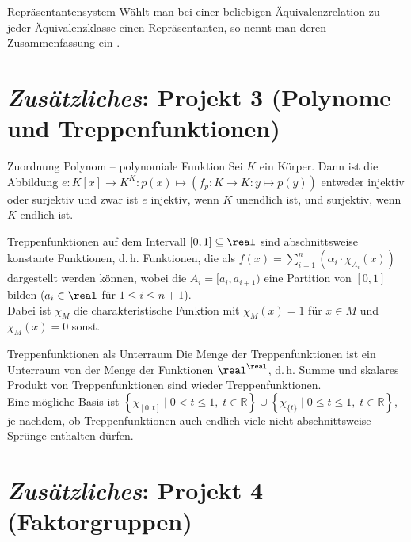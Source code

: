 \begin{Def}{Repräsentantensystem}
    Wählt man bei einer beliebigen Äquivalenzrelation zu jeder
    Äquivalenzklasse einen Repräsentanten, so nennt man deren
    Zusammenfassung ein .
\end{Def}

\section{%
    \emph{Zusätzliches}: Projekt 3 (Polynome und Treppenfunktionen)%
}

\begin{Satz}{Zuordnung Polynom -- polynomiale Funktion}
    Sei $K$ ein Körper.
    Dann ist die Abbildung
    $e: K[x] \rightarrow K^K: p(x) \mapsto
    (f_p: K \rightarrow K: y \mapsto p(y))$
    entweder injektiv oder surjektiv und zwar ist
    $e$ injektiv, wenn $K$ unendlich ist, und surjektiv, wenn $K$ endlich ist.
\end{Satz}

\begin{Def}{Treppenfunktionen}
     auf dem Intervall $[0, 1] \subseteq \real$
    sind abschnittsweise konstante Funktionen, d.\,h. Funktionen, die als
    $f(x) = \sum_{i=1}^n \left(\alpha_i \cdot \chi_{A_i}(x)\right)$ dargestellt
    werden können, wobei die $A_i = [a_i, a_{i+1})$ eine Partition von
    $[0, 1]$ bilden ($a_i \in \real$ für $1 \le i \le n + 1$). \\
    Dabei ist $\chi_M$ die charakteristische Funktion mit $\chi_M(x) = 1$ für
    $x \in M$ und $\chi_M(x) = 0$ sonst.
\end{Def}

\begin{Satz}{Treppenfunktionen als Unterraum}
    Die Menge der Treppenfunktionen ist ein Unterraum von der Menge der
    Funktionen $\real^\real$, d.\,h. Summe und skalares Produkt von
    Treppenfunktionen sind wieder Treppenfunktionen. \\
    Eine mögliche Basis ist
    $\left\{ \chi_{[0, t]} \;|\; 0 < t \le 1,\; t \in \mathbb{R} \right\} \cup
    \left\{ \chi_{\{t\}} \;|\; 0 \le t \le 1,\; t \in \mathbb{R} \right\}$,
    je nachdem, ob Treppenfunktionen auch endlich viele nicht-abschnittsweise
    Sprünge enthalten dürfen.
\end{Satz}

\section{%
    \emph{Zusätzliches}: Projekt 4 (Faktorgruppen)%
}

